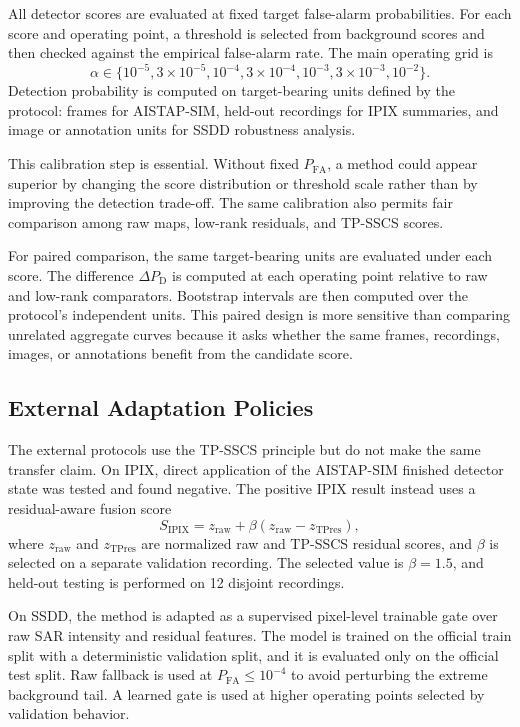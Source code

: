\documentclass[journal]{IEEEtran}
\begin{document}
All detector scores are evaluated at fixed target false-alarm probabilities. For each score and operating point, a threshold is selected from background scores and then checked against the empirical false-alarm rate. The main operating grid is
\begin{equation}
    \alpha \in \{10^{-5}, 3\times10^{-5}, 10^{-4}, 3\times10^{-4},
    10^{-3}, 3\times10^{-3}, 10^{-2}\}.
\end{equation}
Detection probability is computed on target-bearing units defined by the protocol: frames for AISTAP-SIM, held-out recordings for IPIX summaries, and image or annotation units for SSDD robustness analysis.

This calibration step is essential. Without fixed $P_{\mathrm{FA}}$, a method could appear superior by changing the score distribution or threshold scale rather than by improving the detection trade-off. The same calibration also permits fair comparison among raw maps, low-rank residuals, and TP-SSCS scores.

For paired comparison, the same target-bearing units are evaluated under each score. The difference $\Delta P_{\mathrm{D}}$ is computed at each operating point relative to raw and low-rank comparators. Bootstrap intervals are then computed over the protocol's independent units. This paired design is more sensitive than comparing unrelated aggregate curves because it asks whether the same frames, recordings, images, or annotations benefit from the candidate score.

\subsection{External Adaptation Policies}

The external protocols use the TP-SSCS principle but do not make the same transfer claim. On IPIX, direct application of the AISTAP-SIM finished detector state was tested and found negative. The positive IPIX result instead uses a residual-aware fusion score
\begin{equation}
    S_{\mathrm{IPIX}} = z_{\mathrm{raw}} + \beta
    (z_{\mathrm{raw}} - z_{\mathrm{TPres}}),
\end{equation}
where $z_{\mathrm{raw}}$ and $z_{\mathrm{TPres}}$ are normalized raw and TP-SSCS residual scores, and $\beta$ is selected on a separate validation recording. The selected value is $\beta=1.5$, and held-out testing is performed on 12 disjoint recordings.

On SSDD, the method is adapted as a supervised pixel-level trainable gate over raw SAR intensity and residual features. The model is trained on the official train split with a deterministic validation split, and it is evaluated only on the official test split. Raw fallback is used at $P_{\mathrm{FA}} \leq 10^{-4}$ to avoid perturbing the extreme background tail. A learned gate is used at higher operating points selected by validation behavior.
\end{document}
